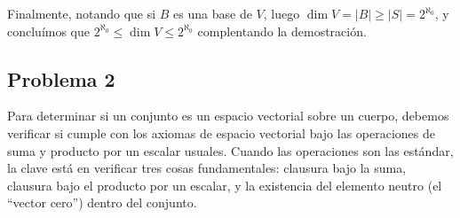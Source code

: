 \documentclass[11pt,spanish]{article}
\begin{document}
\begin{itemize}
Finalmente, notando que si $B$ es una base de $V$, luego $\dim V = |B|\geq |S|=2^{\aleph_0}$, y conclu\'imos que
$2^{\aleph_0}\leq \dim V \leq 2^{\aleph_0}$ complentando la demostraci\'on.

\end{itemize}

\subsection*{Problema 2}

Para determinar si un conjunto es un espacio vectorial sobre un cuerpo, debemos verificar si cumple con los axiomas de espacio vectorial bajo las operaciones de suma y producto por un escalar usuales. Cuando las operaciones son las estándar, la clave está en verificar tres cosas fundamentales: clausura bajo la suma, clausura bajo el producto por un escalar, y la existencia del elemento neutro (el ``vector cero'') dentro del conjunto.
\end{document}
